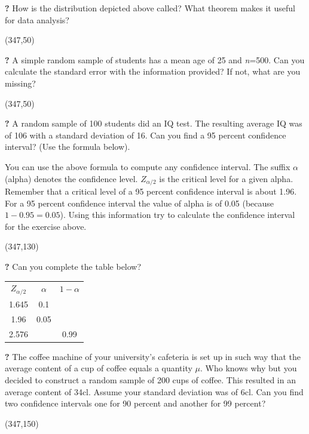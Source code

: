 \documentclass{article}
\newcommand{\forceindent}{\leavevmode{\parindent=2em\indent}}
\begin{document}
\forceindent \textbf{?} How is the distribution depicted above called? What theorem makes it useful for data analysis?

\framebox(347,50){}

\forceindent \textbf{?} A simple random sample of students has a mean age of 25 and \textit{n}=500. Can you calculate the standard error with the information provided? If not, what are you missing?

\framebox(347,50){}

\forceindent \textbf{?} A random sample of 100 students did an IQ test. The resulting average IQ was of 106 with a standard deviation of 16. Can you find a 95 percent confidence interval? (Use the formula below).

\begin{center}
\end{center}

You can use the above formula to compute any confidence interval. The suffix $\alpha$ (alpha) denotes the confidence level. $Z_{\alpha/2}$ is the critical level for a given alpha. Remember that a critical level of a 95 percent confidence interval is about 1.96. For a 95 percent confidence interval the value of alpha is of 0.05 (because $1-0.95=0.05$). Using this information try to calculate the confidence interval for the exercise above.

\framebox(347,130){}

\forceindent \textbf{?} Can you complete the table below?

\begin{table}[H]
	\centering
	\begin{large}
	\begin{tabular}{ccc}
		\underline{$Z_{\alpha/2}$} & \underline{$\alpha$} & \underline{$1-\alpha$} \\
		1.645          & 0.1          &           \\
		1.96          & 0.05          &           \\
		2.576         &          & 0.99        
	\end{tabular}
	\end{large}
\end{table}

\forceindent \textbf{?} The coffee machine of your university's cafeteria is set up in such way that the average content of a cup of coffee equals a quantity $\mu$. Who knows why but you decided to construct a random sample of 200 cups of coffee. This resulted in an average content of 34cl. Assume your standard deviation was of 6cl. Can you find two confidence intervals one for 90 percent and another for 99 percent?

\framebox(347,150){}
\end{document}
